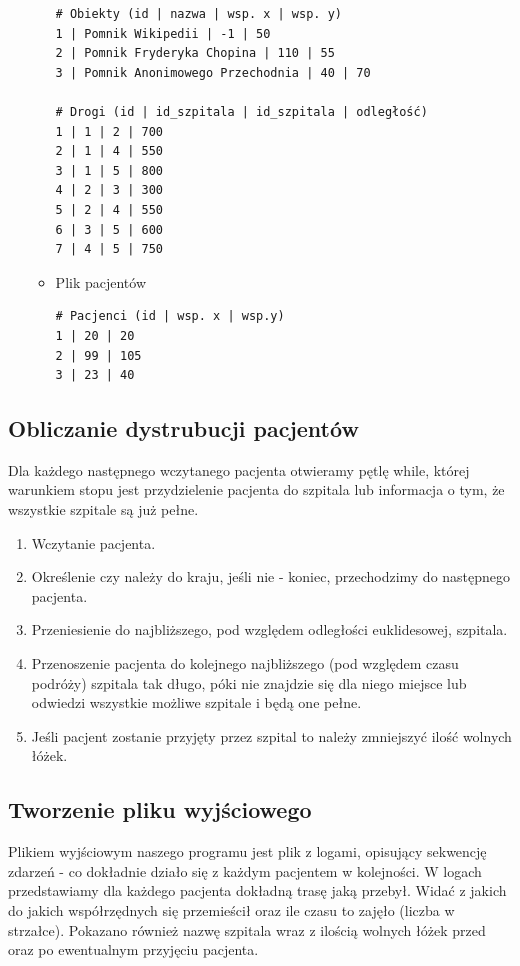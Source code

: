 \documentclass[11pt, a4paper]{article}
\begin{document}
\begin{itemize}
\begin{itemize}
\begin{lstlisting}
# Obiekty (id | nazwa | wsp. x | wsp. y)
1 | Pomnik Wikipedii | -1 | 50
2 | Pomnik Fryderyka Chopina | 110 | 55
3 | Pomnik Anonimowego Przechodnia | 40 | 70

# Drogi (id | id_szpitala | id_szpitala | odległość)
1 | 1 | 2 | 700
2 | 1 | 4 | 550
3 | 1 | 5 | 800
4 | 2 | 3 | 300
5 | 2 | 4 | 550
6 | 3 | 5 | 600
7 | 4 | 5 | 750
    \end{lstlisting}
    
    \item Plik pacjentów
    \begin{lstlisting}
# Pacjenci (id | wsp. x | wsp.y)
1 | 20 | 20
2 | 99 | 105
3 | 23 | 40
    \end{lstlisting}
    \end{itemize}

\end{itemize}



\subsection{Obliczanie dystrubucji pacjentów}
Dla każdego następnego wczytanego pacjenta otwieramy pętlę while, której warunkiem stopu jest przydzielenie pacjenta do szpitala lub informacja o tym, że wszystkie szpitale są już pełne. 
\begin{enumerate}
    \item Wczytanie pacjenta.
    \item Określenie czy należy do kraju, jeśli nie - koniec, przechodzimy do następnego pacjenta.
    \item Przeniesienie do najbliższego, pod względem odległości euklidesowej, szpitala.
    \item Przenoszenie pacjenta do kolejnego najbliższego (pod względem czasu podróży) szpitala tak długo, póki nie znajdzie się dla niego miejsce lub odwiedzi wszystkie możliwe szpitale i będą one pełne.
    \item Jeśli pacjent zostanie przyjęty przez szpital to należy zmniejszyć ilość wolnych łóżek.
\end{enumerate}

\subsection{Tworzenie pliku wyjściowego}
Plikiem wyjściowym naszego programu jest plik z logami, opisujący sekwencję zdarzeń - co dokładnie działo się z każdym pacjentem w kolejności.
W logach przedstawiamy dla każdego pacjenta dokładną trasę jaką przebył. Widać z jakich do jakich współrzędnych się przemieścił oraz ile czasu to zajęło (liczba w strzałce). Pokazano również nazwę szpitala wraz z ilością wolnych łóżek przed oraz po ewentualnym przyjęciu pacjenta.
\end{document}
